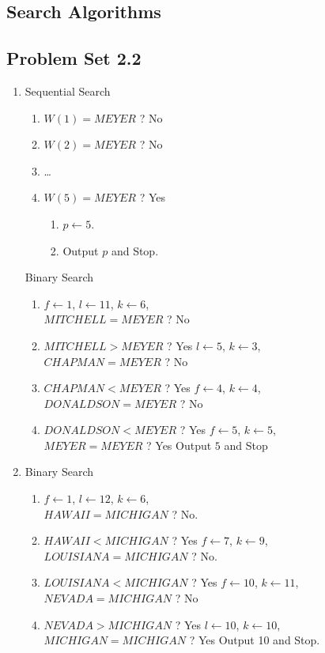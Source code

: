 \subsection{Search Algorithms}
\subsection*{Problem Set 2.2}
\begin{enumerate}
	\item Sequential Search 
	\begin{enumerate}
		\item $W(1) = MEYER$ ? No
		\item $W(2) = MEYER$ ? No
		\item \dots
		\setcounter{enumii}{4}
		\item $W(5) = MEYER$ ? Yes
		\begin{enumerate}
			\item $p \leftarrow 5$.
			\item Output $p$ and Stop.
		\end{enumerate}
	\end{enumerate}
	Binary Search
	\begin{enumerate}
		\item $f \leftarrow 1$, $l \leftarrow 11$, $k \leftarrow 6$,\\ $MITCHELL = MEYER$ ? No 
		\item $MITCHELL > MEYER$ ? Yes $l \leftarrow 5$, $k \leftarrow 3$,\\ $CHAPMAN = MEYER$ ? No
		\item $CHAPMAN < MEYER$ ? Yes $f \leftarrow 4$, $k \leftarrow 4$,\\ $DONALDSON = MEYER$ ? No
		\item $DONALDSON < MEYER$ ? Yes $f \leftarrow 5$, $k \leftarrow 5$,\\ $MEYER = MEYER$ ? Yes Output $5$ and Stop
	\end{enumerate}
	\item Binary Search
	\begin{enumerate}
		\item $f \leftarrow 1$, $l \leftarrow 12$, $k \leftarrow 6$,\\ $HAWAII = MICHIGAN$ ? No.
		\item $HAWAII < MICHIGAN$ ? Yes $f \leftarrow 7$, $k \leftarrow 9$,\\ $LOUISIANA = MICHIGAN$ ? No.
		\item $LOUISIANA < MICHIGAN$ ? Yes $f \leftarrow 10$, $k \leftarrow 11$,\\ $NEVADA = MICHIGAN$ ? No
		\item $NEVADA > MICHIGAN$ ? Yes $l \leftarrow 10$, $k \leftarrow 10$,\\ $MICHIGAN = MICHIGAN$ ? Yes Output 10 and Stop.
	\end{enumerate}
\end{enumerate}
